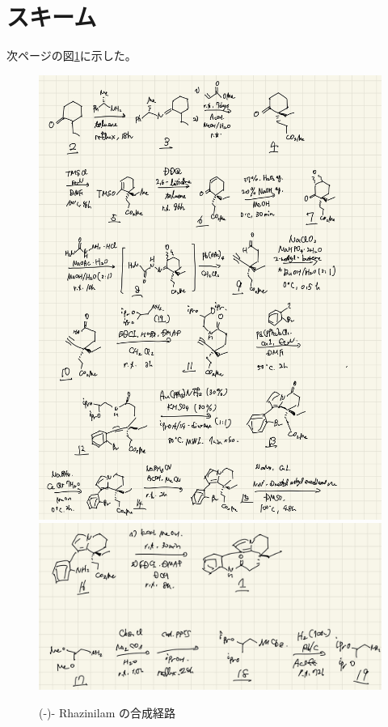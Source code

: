 \documentclass{ltjsarticle}
\theoremstyle{definition}
\numberwithin{equation}{section}
\begin{document}
\section{スキーム}
次ページの図\ref{scheme}に示した。
\begin{figure}[htbp]
\begin{center}
\includegraphics[width = 13 cm]{scheme1.jpg}
\includegraphics[width = 13 cm]{scheme2.jpg}
\caption{(-)- Rhazinilam の合成経路}
\label{scheme}
\end{center}
\end{figure}
\end{document}
